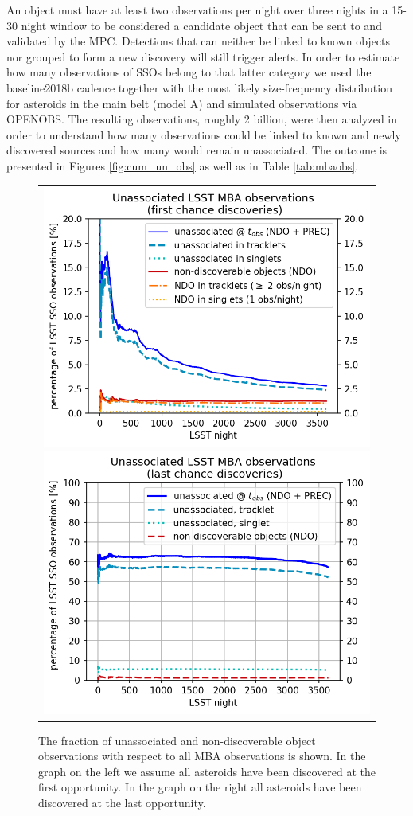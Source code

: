 An object must have at least two observations per night over three nights in a 15-30 night window to be considered a candidate object that can be sent to and validated by the \gls{MPC}.
Detections that can neither be linked to known objects nor grouped to form a new discovery will still trigger alerts.
In order to estimate how many observations of SSOs belong to that latter category we used the baseline2018b cadence together with the most likely size-frequency distribution for
asteroids in the main belt (model A) and simulated observations via OPENOBS. The resulting observations, roughly 2 billion, were then analyzed in order to understand how many observations could be linked to known and newly discovered sources and how many would remain unassociated.
The outcome is presented in Figures \ref{fig:cum_un_obs} as well as in Table \ref{tab:mbaobs}.
\begin{figure}[tb!]
\begin{center}
\begin{tabular}{c}
\includegraphics[width=0.50\linewidth]{figs/unasoc_frac_first_chance3.png}
\includegraphics[width=0.50\linewidth]{figs/unasoc_frac_last_chance3.png}
\end{tabular}
\end{center}
\caption{The fraction of unassociated and non-discoverable object observations with respect to all \gls{MBA} observations is shown. In the graph on the left we assume all asteroids have been discovered at the first opportunity. In the graph on the right all asteroids have been discovered at the last opportunity. \label{fig:ufc} }
\end{figure}
